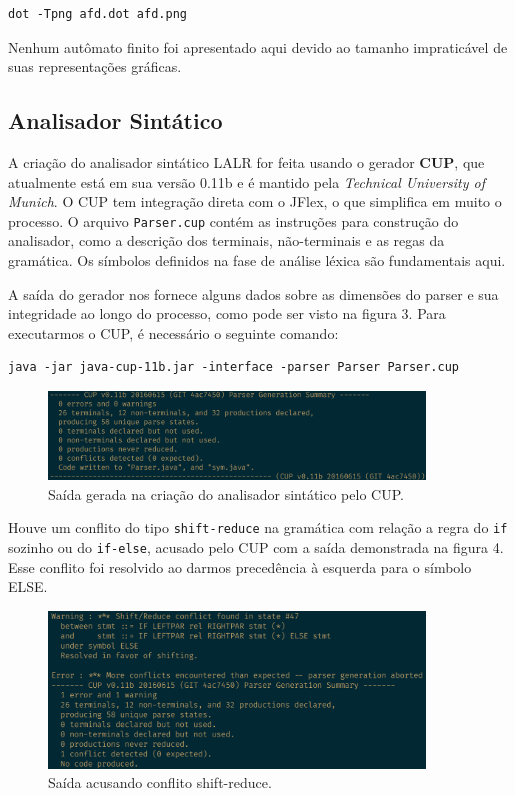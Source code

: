 \begin{Verbatim}[frame=single]
dot -Tpng afd.dot afd.png
\end{Verbatim}

Nenhum autômato finito foi apresentado aqui devido ao tamanho impraticável de suas representações gráficas.

\subsection{Analisador Sintático}
A criação do analisador sintático LALR for feita usando o gerador \textbf{CUP}\cite{cup_2017}, que atualmente está em sua versão 0.11b e é mantido pela \textit{Technical University of Munich}. O CUP tem integração direta com o JFlex, o que simplifica em muito o processo. O arquivo \texttt{Parser.cup} contém as instruções para construção do analisador, como a descrição dos terminais, não-terminais e as regas da gramática. Os símbolos definidos na fase de análise léxica são fundamentais aqui. 

A saída do gerador nos fornece alguns dados sobre as dimensões do parser e sua integridade ao longo do processo, como pode ser visto na figura 3. Para executarmos o CUP, é necessário o seguinte comando:

\begin{Verbatim}[frame=single]
java -jar java-cup-11b.jar -interface -parser Parser Parser.cup
\end{Verbatim}

\begin{figure}[h]	
 \centering
  \includegraphics[width=10cm,keepaspectratio]{images/parser.png}
 \caption{Saída gerada na criação do analisador sintático pelo CUP.}
\end{figure}

Houve um conflito do tipo \texttt{shift-reduce} na gramática com relação  a regra do \texttt{if} sozinho ou do \texttt{if-else}, acusado pelo CUP com a saída demonstrada na figura 4. Esse conflito foi resolvido ao darmos precedência à esquerda para o símbolo ELSE.

\begin{figure}[h]	
 \centering
  \includegraphics[width=10cm,keepaspectratio]{images/shift-reduce.png}
 \caption{Saída acusando conflito shift-reduce.}
\end{figure}

